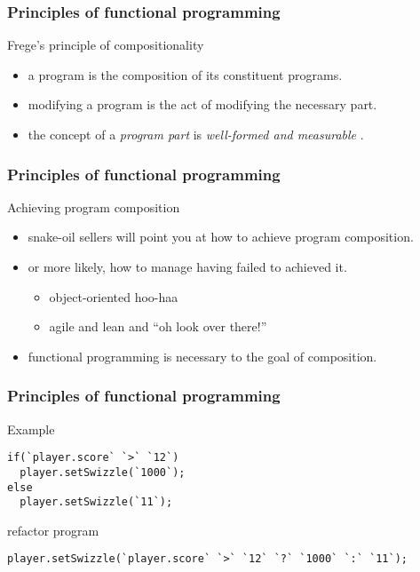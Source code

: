 \begin{frame}
\frametitle{Principles of functional programming}
\begin{block}{Frege's principle of compositionality \cite{janssen2001frege}}
\begin{itemize}
\item<1-> a program is the composition of its constituent programs.
\item<2-> modifying a program is the act of modifying the necessary part.
\item<3-> the concept of a \emph{program part} is \emph{well-formed and measurable} \cite{hughes1989functional}.
\end{itemize}
\end{block}
\end{frame}

\begin{frame}
\frametitle{Principles of functional programming}
\begin{block}{Achieving program composition}
\begin{itemize}
\item<1-> snake-oil sellers will point you at how to achieve program composition.
\item<2-> or more likely, how to manage having failed to achieved it.
          \begin{itemize}
          \item \tiny{object-oriented hoo-haa}
          \item \tiny{agile and lean and ``oh look over there!''}
          \end{itemize}
\item<3-> functional programming is necessary to the goal of composition.
\end{itemize}
\end{block}
\end{frame}

\begin{frame}[fragile]
\frametitle{Principles of functional programming}
\begin{block}{Example}
\begin{lstlisting}[style=java,mathescape,basicstyle=\scriptsize]
if(`player.score` `>` `12`)
  player.setSwizzle(`1000`);
else
  player.setSwizzle(`11`);
\end{lstlisting}
\end{block}
\begin{block}{refactor program}
\begin{lstlisting}[style=java,mathescape,basicstyle=\scriptsize]
player.setSwizzle(`player.score` `>` `12` `?` `1000` `:` `11`);
\end{lstlisting}
\end{block}
\end{frame}


